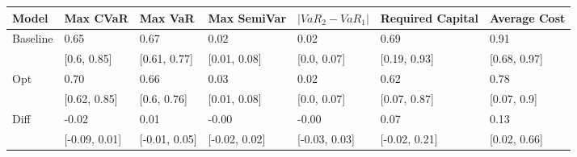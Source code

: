 \begin{tabular}{lllllll}
\toprule
   Model &      Max CVaR &       Max VaR &   Max SemiVar & $|VaR_2 - VaR_1|$ & Required Capital & Average Cost \\
\midrule
Baseline &          0.65 &          0.67 &          0.02 &              0.02 &             0.69 &         0.91 \\
         &   [0.6, 0.85] &  [0.61, 0.77] &  [0.01, 0.08] &       [0.0, 0.07] &     [0.19, 0.93] & [0.68, 0.97] \\
     Opt &          0.70 &          0.66 &          0.03 &              0.02 &             0.62 &         0.78 \\
         &  [0.62, 0.85] &   [0.6, 0.76] &  [0.01, 0.08] &       [0.0, 0.07] &     [0.07, 0.87] &  [0.07, 0.9] \\
    Diff &         -0.02 &          0.01 &         -0.00 &             -0.00 &             0.07 &         0.13 \\
         & [-0.09, 0.01] & [-0.01, 0.05] & [-0.02, 0.02] &     [-0.03, 0.03] &    [-0.02, 0.21] & [0.02, 0.66] \\
\bottomrule
\end{tabular}
